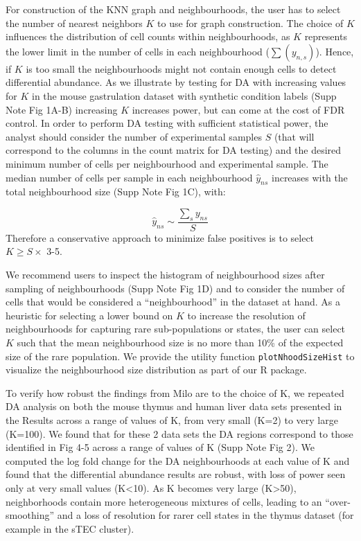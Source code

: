 \documentclass[
]{article}
\begin{document}
For construction of the KNN graph and neighbourhoods, the user has to select the number of nearest neighbors \(K\) to use for graph construction.
The choice of \(K\) influences the distribution of cell counts within neighbourhoods, as \(K\) represents the lower limit in the number of cells in each neighbourhood (\(\sum(y_{n,s})\)). Hence, if \(K\) is too small the neighbourhoods might not contain enough cells to detect differential abundance. As we illustrate by testing for DA with increasing values for \(K\) in the mouse gastrulation dataset with synthetic condition labels (Supp Note Fig 1A-B) increasing \(K\) increases power, but can come at the cost of FDR control.
In order to perform DA testing with sufficient statistical power, the analyst should consider the number of experimental samples \(S\) (that will correspond to the columns in the count matrix for DA testing) and the desired minimum number of cells per neighbourhood and experimental sample.
The median number of cells per sample in each neighbourhood \(\hat{y}_{ns}\) increases with the total neighbourhood size (Supp Note Fig 1C), with:

\[
\hat{y}_{ns} \sim \frac{\sum_s y_{ns}}{S}
\]
Therefore a conservative approach to minimize false positives is to select \(K \geq S \times\) 3-5.

We recommend users to inspect the histogram of neighbourhood sizes after sampling of neighbourhoods (Supp Note Fig 1D) and to consider the number of cells that would be considered a ``neighbourhood'' in the dataset at hand. As a heuristic for selecting a lower bound on \(K\) to increase the resolution of neighbourhoods for capturing rare sub-populations or states, the user can select \(K\) such that the mean neighbourhood size is no more than 10\% of the expected size of the rare population. We provide the utility function
\texttt{plotNhoodSizeHist} to visualize the neighbourhood size distribution as part of our R package.

To verify how robust the findings from Milo are to the choice of K, we repeated DA analysis on both the mouse thymus and human liver data sets presented in the Results across a range of values of K, from very small (K=2) to very large (K=100). We found that for these 2 data sets the DA regions correspond to those identified in Fig 4-5 across a range of values of K (Supp Note Fig 2). We computed the log fold change for the DA neighbourhoods at each value of K and found that the differential abundance results are robust, with loss of power seen only at very small values (K\textless10). As K becomes very large (K\textgreater50), neighborhoods contain more heterogeneous mixtures of cells, leading to an ``over-smoothing'' and a loss of resolution for rarer cell states in the thymus dataset (for example in the sTEC cluster).
\end{document}
